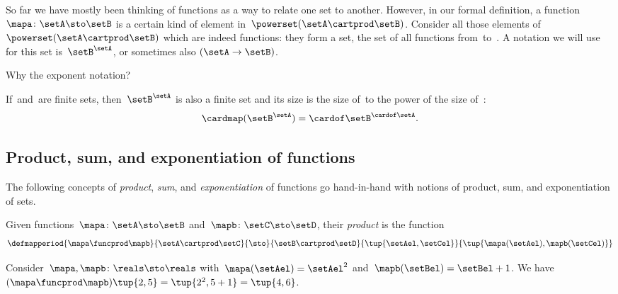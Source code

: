 So far we have mostly been thinking of functions as a way to relate one set to another.
However, in our formal definition, a function~$\mapa \colon \setA \sto \setB$ is a certain kind of element in~$\powerset (\setA \cartprod \setB)$.
Consider all those elements of~$\powerset (\setA \cartprod \setB)$ which are indeed functions: they form a set, the set of all functions from~\setA to~\setB.
A notation we will use for this set is~$\setB^{\setA}$, or sometimes also $(\setA \to \setB)$.

Why the exponent notation?

If~\setA and~\setB are finite sets, then~$\setB^{\setA}$ is also a finite set and its size is the size of~\setB to the power of the size of~\setA:
\begin{equation}
    \cardmap(\setB^{\setA}) = {\cardof\setB} ^ {\cardof \setA}.
\end{equation}

\subsection{Product, sum, and exponentiation of functions}
\label{sec:prod_dirsum_functions}

The following concepts of \emph{product}, \emph{sum}, and \emph{exponentiation} of functions go hand-in-hand with notions of product, sum, and exponentiation of sets.

\begin{ctdefinition}
    \label{def:product-of-functions}
    Given functions~$\mapa\colon \setA \sto \setB$ and~$\mapb\colon \setC \sto \setD$, their \emph{product} is the function
    \begin{equation}
        \defmapperiod{
            \mapa \funcprod \mapb
        }{
            \setA \cartprod \setC
        }{
            \sto
        }{
            \setB\cartprod \setD
        }{
            \tup{\setAel, \setCel}
        }{
            \tup{\mapa(\setAel),\mapb(\setCel)}
        }
    \end{equation}
\end{ctdefinition}

\begin{example}
    Consider~$\mapa,\mapb \colon \reals \sto \reals$ with~$\mapa(\setAel)=\setAel^2$ and~$\mapb(\setBel)=\setBel+1$.
    We have~$(\mapa \funcprod \mapb)\tup{2,5}=\tup{2^2,5+1}=\tup{4,6}$.
\end{example}


